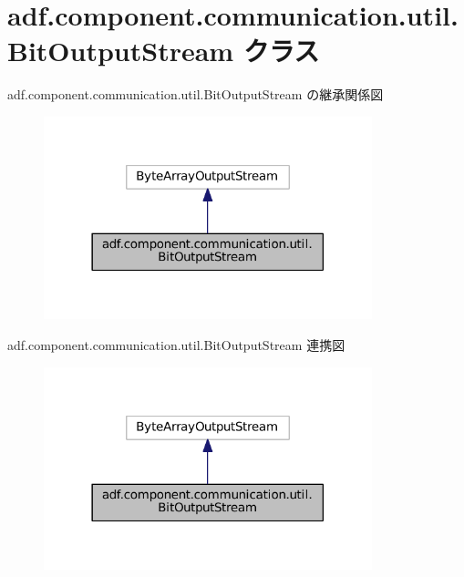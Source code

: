 \hypertarget{classadf_1_1component_1_1communication_1_1util_1_1BitOutputStream}{}\section{adf.\+component.\+communication.\+util.\+Bit\+Output\+Stream クラス}
\label{classadf_1_1component_1_1communication_1_1util_1_1BitOutputStream}


adf.\+component.\+communication.\+util.\+Bit\+Output\+Stream の継承関係図
\nopagebreak
\begin{figure}[H]
\begin{center}
\leavevmode
\includegraphics[width=270pt]{classadf_1_1component_1_1communication_1_1util_1_1BitOutputStream__inherit__graph}
\end{center}
\end{figure}


adf.\+component.\+communication.\+util.\+Bit\+Output\+Stream 連携図
\nopagebreak
\begin{figure}[H]
\begin{center}
\leavevmode
\includegraphics[width=270pt]{classadf_1_1component_1_1communication_1_1util_1_1BitOutputStream__coll__graph}
\end{center}
\end{figure}
